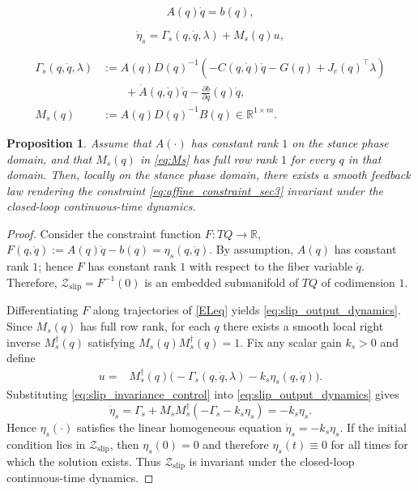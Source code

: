 \documentclass[10pt,a4paper]{amsart}
\newtheorem{proposition}{Proposition}
\begin{document}
\begin{equation}
A(q)\dot q=b(q),
\label{eq:affine_constraint_sec3}
\end{equation}

\begin{equation}
\dot\eta_s
=
\Gamma_s(q,\dot q,\lambda)+M_s(q)u,
\label{eq:slip_output_dynamics}
\end{equation}

\begin{align}
\Gamma_s(q,\dot q,\lambda)
&:=
A(q)D(q)^{-1}\!\left(-C(q,\dot q)\dot q-G(q)+J_c(q)^\top\lambda\right)
\nonumber\\
&\qquad
+\dot A(q,\dot q)\dot q-\frac{\partial b}{\partial q}(q)\dot q,
\label{eq:Gamma_s}
\\
M_s(q)&:=A(q)D(q)^{-1}B(q)\in\mathbb R^{1\times m}.
\label{eq:Ms}
\end{align} 

\begin{proposition}
Assume that $A(\cdot)$ has constant rank $1$ on the stance phase domain, and that $M_s(q)$ in \eqref{eq:Ms} has full row rank $1$ for every $q$ in that domain. Then, locally on the stance phase domain, there exists a smooth feedback law rendering the constraint \eqref{eq:affine_constraint_sec3} invariant under the closed-loop continuous-time dynamics.
\end{proposition}

\begin{proof}
Consider the constraint function $F:TQ\to\mathbb{R}$, $F(q,\dot q):=A(q)\dot q-b(q)=\eta_s(q,\dot q)$. By assumption, $A(q)$ has constant rank $1$; hence $F$ has constant rank $1$ with respect to the fiber variable $\dot q$. Therefore, $\mathcal Z_{\mathrm{slip}}=F^{-1}(0)$ is an embedded submanifold of $TQ$ of codimension $1$.

Differentiating $F$ along trajectories of \eqref{ELeq} yields \eqref{eq:slip_output_dynamics}. Since $M_s(q)$ has full row rank, for each $q$ there exists a smooth local right inverse $M_s^\dagger(q)$ satisfying
$M_s(q)M_s^\dagger(q)=1$. Fix any scalar gain $k_s>0$ and define
\begin{align}
u
=&
M_s^\dagger(q)\bigl(-\Gamma_s(q,\dot q,\lambda)-k_s\eta_s(q,\dot q)\bigr).
\label{eq:slip_invariance_control}
\end{align}
Substituting \eqref{eq:slip_invariance_control} into \eqref{eq:slip_output_dynamics} gives
\[
\dot\eta_s
=
\Gamma_s+M_sM_s^\dagger(-\Gamma_s-k_s\eta_s)
=
-k_s\eta_s.
\]
Hence $\eta_s(\cdot)$ satisfies the linear homogeneous equation $\dot\eta_s=-k_s\eta_s$. If the initial condition lies in $\mathcal Z_{\mathrm{slip}}$, then $\eta_s(0)=0$ and therefore $\eta_s(t)\equiv 0$ for all times for which the solution exists. Thus $\mathcal Z_{\mathrm{slip}}$ is invariant under the closed-loop continuous-time dynamics.
\end{proof}
\end{document}
